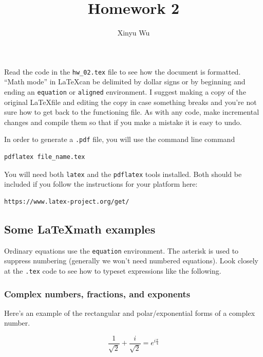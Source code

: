 \documentclass{article}
\title{Homework 2}
\author{Xinyu Wu}
\date{}
\begin{document}
\maketitle %

Read the code in the \texttt{hw\_02.tex} file to see how the document is formatted. ``Math mode'' in \LaTeX  can be delimited by dollar signs or by beginning and ending an \texttt{equation} or \texttt{aligned} environment. I suggest making a copy of the original \LaTeX file and editing the copy in case something breaks and you're not sure how to get back to the functioning file. As with any code, make incremental changes and compile them so that if you make a mistake it is easy to undo.

In order to generate a \texttt{.pdf} file, you will use the command line command

\begin{verbatim}
pdflatex file_name.tex
\end{verbatim}

You will need both \texttt{latex} and the \texttt{pdflatex} tools installed. Both should be included if you follow the instructions for your platform here:

\begin{verbatim}
https://www.latex-project.org/get/
\end{verbatim}

\subsection*{Some \LaTeX  math examples}

Ordinary equations use the \texttt{equation} environment. The asterisk is used to suppress numbering (generally we won't need numbered equations). Look closely at the \texttt{.tex} code to see how to typeset expressions like the following.

\subsubsection*{Complex numbers, fractions, and exponents}

Here's an example of the rectangular and polar/exponential forms of a complex number.

\begin{equation*}
   \frac{1}{\sqrt{2}} + \frac{i}{\sqrt{2}} = e^{i\frac{\pi}{4}}
\end{equation*}
\end{document}
